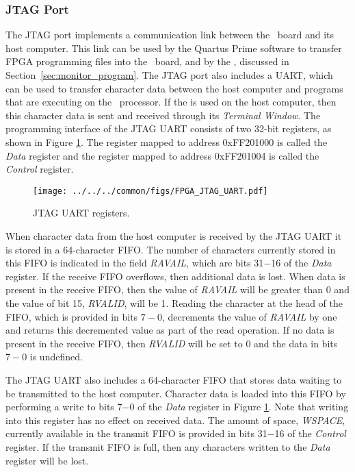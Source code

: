 \subsubsection{JTAG Port}
\label{sec:jtag_port}

The JTAG port implements a communication link between the \DEBoard~board and its host computer.  
This link can be used by the Quartus Prime software to transfer FPGA programming files 
into the \DEBoard~board, and by the \productNameMed{}, discussed in 
Section~\ref{sec:monitor_program}.  The JTAG port also
includes a UART, which can be used to transfer character data between the host computer and
programs that are executing on the \processor~processor.
If the \productNameMed{} is used on the host computer, then this character 
data is sent and received through its {\it Terminal Window}.  The programming interface 
of the JTAG UART consists of two 32-bit registers, as shown in Figure \ref{fig:jtag_port}. 
The register mapped to address {\sf 0xFF201000} is called the {\it Data}
register and the register mapped to address {\sf 0xFF201004} is called the {\it Control}
register.

\begin{figure}[h!]
   \begin{center}
       \texttt{[image: ../../../common/figs/FPGA\_JTAG\_UART.pdf]}
   \end{center}
   \caption{JTAG UART registers.}
	\label{fig:jtag_port}
\end{figure}

When character data from the host computer is received by the JTAG UART 
it is stored in a 64-character FIFO.  The number of characters currently stored in this FIFO is
indicated in the field {\it RAVAIL}, which are
bits 31$-$16 of the {\it Data} register.  If the receive FIFO overflows, then
additional
data is lost. When data is present in the receive FIFO, then the value of {\it RAVAIL} will be 
greater than 0 and the value of bit 15, {\it RVALID}, will be 1. Reading the character at
the head of the FIFO, which is provided in bits $7-0$, decrements the value of {\it RAVAIL} 
by one and returns this decremented value as part of the read
operation. If no data is present in the receive FIFO, then {\it RVALID} will 
be set to 0 and the data in bits $7-0$ is undefined.

The JTAG UART also includes a 64-character FIFO that stores data 
waiting to be transmitted to the host computer. 
Character data is loaded into this FIFO by performing a write to bits 7$-$0
of the {\it Data} register in Figure \ref{fig:jtag_port}.  
Note that writing into this register has no effect 
on received data.  The amount of space, {\it WSPACE}, currently available in the transmit FIFO is 
provided in bits 31$-$16 of the {\it Control} register.  If
the transmit FIFO is full, then any characters written to the {\it Data} register will be lost.

